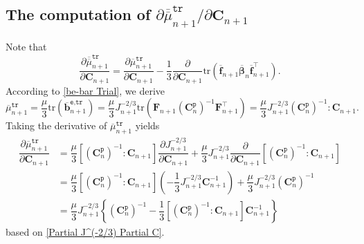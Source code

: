 \documentclass[preprint,11pt]{elsarticle}
\theoremstyle{definition}
\begin{document}
\subsection[]{The computation of $\partial \overline{\overline{\mu}}_{n+1}^\texttt{tr} / \partial \mathbf{C}_{n+1}$} 

Note that
\begin{equation} \label{Partial mu-bar-bar Partial C}
    \dfrac{\partial \overline{\overline{\mu}}_{n+1}^\texttt{tr}}{\partial \mathbf{C}_{n+1}} = \dfrac{\partial \overline{\mu}_{n+1}^\texttt{tr}}{\partial \mathbf{C}_{n+1}}
    - \dfrac{1}{3} \dfrac{\partial}{\partial \mathbf{C}_{n+1}}
    \text{tr} \left( \overline{\mathbf{f}}_{n+1} \overline{\boldsymbol{\beta}}_n \overline{\mathbf{f}}_{n+1}^\top \right).
\end{equation}
According to \eqref{be-bar Trial}, we derive
\begin{equation*}
    \overline{\mu}_{n+1}^\texttt{tr}
    = \dfrac{\mu}{3} \text{tr} \left( \overline{\mathbf{b}}_{n+1}^\texttt{e,tr} \right)
    = \dfrac{\mu}{3} J_{n+1}^{-2/3} \text{tr} \left( \mathbf{F}_{n+1} \left( \mathbf{C}_n^\texttt{p} \right)^{-1} \mathbf{F}_{n+1}^\top \right)
    = \dfrac{\mu}{3} J_{n+1}^{-2/3} \left( \mathbf{C}_n^\texttt{p} \right)^{-1} : \mathbf{C}_{n+1}.
\end{equation*}
Taking the derivative of $\overline{\mu}_{n+1}^\texttt{tr}$ yields
\begin{equation} \label{Partial mu-bar Partial C}
    \begin{array}{ll}
        \dfrac{\partial \overline{\mu}_{n+1}^\texttt{tr}}{\partial \mathbf{C}_{n+1}}
        & = \dfrac{\mu}{3} \left[ \left( \mathbf{C}_n^\texttt{p} \right)^{-1} : \mathbf{C}_{n+1} \right] \dfrac{\partial J_{n+1}^{-2/3}}{\partial \mathbf{C}_{n+1}}
        + \dfrac{\mu}{3} J_{n+1}^{-2/3} \dfrac{\partial}{\partial \mathbf{C}_{n+1}} \left[ \left( \mathbf{C}_n^\texttt{p} \right)^{-1} : \mathbf{C}_{n+1} \right] \\[12pt]
        & = \dfrac{\mu}{3} \left[ \left( \mathbf{C}_n^\texttt{p} \right)^{-1} : \mathbf{C}_{n+1} \right]
        \left( - \dfrac{1}{3} J_{n+1}^{-2/3} \mathbf{C}_{n+1}^{-1} \right)
        + \dfrac{\mu}{3} J_{n+1}^{-2/3} \left( \mathbf{C}_n^\texttt{p} \right)^{-1} \\[12pt]
        &= \dfrac{\mu}{3} J_{n+1}^{-2/3}
        \left\{ \left( \mathbf{C}_n^\texttt{p} \right)^{-1}
        - \dfrac{1}{3} \left[ \left( \mathbf{C}_n^\texttt{p} \right)^{-1} : \mathbf{C}_{n+1} \right] \mathbf{C}_{n+1}^{-1} \right\}
    \end{array}
\end{equation}
based on \eqref{Partial J^(-2/3) Partial C}.
\end{document}
